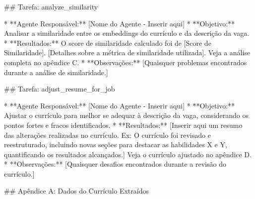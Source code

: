 ## Tarefa: analyze_similarity

* **Agente Responsável:** [Nome do Agente - Inserir aqui]
* **Objetivo:** Analisar a similaridade entre os embeddings do currículo e da descrição da vaga.
* **Resultados:** O score de similaridade calculado foi de [Score de Similaridade].  [Detalhes sobre a métrica de similaridade utilizada]. Veja a análise completa no apêndice C.
* **Observações:** [Quaisquer problemas encontrados durante a análise de similaridade.]

## Tarefa: adjust_resume_for_job

* **Agente Responsável:** [Nome do Agente - Inserir aqui]
* **Objetivo:** Ajustar o currículo para melhor se adequar à descrição da vaga, considerando os pontos fortes e fracos identificados.
* **Resultados:**  [Inserir aqui um resumo das alterações realizadas no currículo.  Ex: O currículo foi revisado e reestruturado, incluindo novas seções para destacar as habilidades X e Y, quantificando os resultados alcançados.] Veja o currículo ajustado no apêndice D.
* **Observações:**  [Quaisquer desafios encontrados durante a revisão do currículo.]



## Apêndice A: Dados do Currículo Extraídos

